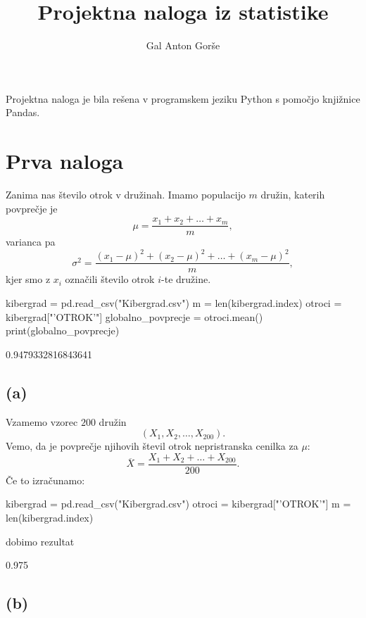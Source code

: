 \documentclass[10pt, a4paper]{article}
\begin{document}
\title{Projektna naloga iz statistike}
\author{Gal Anton Gorše}
\maketitle

Projektna naloga je bila rešena v programskem jeziku Python s pomočjo knjižnice Pandas.

\tableofcontents

\clearpage

\section*{Prva naloga}

Zanima nas število otrok v družinah. Imamo populacijo $m$ družin, katerih povprečje je 
$$\mu = \frac{x_1 + x_2 + \dots + x_m}{m},$$
varianca pa 
$$\sigma^2 = \frac{(x_1 - \mu)^2 + (x_2 - \mu)^2 + \dots + (x_m - \mu)^2}{m},$$
kjer smo z $x_i$ označili število otrok $i$-te družine.

\begin{python}
    kibergrad = pd.read_csv("Kibergrad.csv")
    m = len(kibergrad.index)
    otroci = kibergrad["'OTROK'"]
    globalno_povprecje = otroci.mean()
    print(globalno_povprecje)
\end{python}

\begin{python}
    0.9479332816843641
\end{python}


\subsection*{(a)}

Vzamemo vzorec $200$ družin
$$(X_1, X_2, \dots, X_{200}).$$
Vemo, da je povprečje njihovih števil otrok nepristranska cenilka za $\mu$:
$$\overline{X} = \frac{X_1 + X_2 + \dots + X_{200}}{200}.$$
Če to izračunamo:
\begin{python}
    kibergrad = pd.read_csv("Kibergrad.csv")
    otroci = kibergrad["'OTROK'"]
    m = len(kibergrad.index)
\end{python}
dobimo rezultat
\begin{python}
    0.975
\end{python}

\subsection*{(b)}
\end{document}
